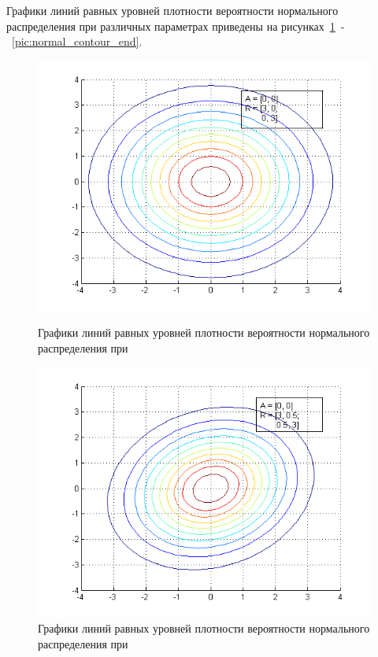 \newpage

Графики линий равных уровней плотности вероятности нормального распределения при различных
параметрах приведены на рисунках~\ref{pic:normal_contour_start}~-~\ref{pic:normal_contour_end}.

\begin{figure}[h]
  \begin{minipage}[h]{0.49\linewidth}
    \includegraphics[width=1\linewidth]{../pic/new/normal_contour_1}
    \caption{Графики линий равных уровней плотности вероятности нормального распределения при }
    \label{pic:normal_contour_start}
  \end{minipage}
  \hfill
  \begin{minipage}[h]{0.49\linewidth}
    \vspace{4mm}
    \includegraphics[width=1\linewidth]{../pic/new/normal_contour_2}
    \caption{Графики линий равных уровней плотности вероятности нормального распределения при }
  \end{minipage}
\end{figure}

